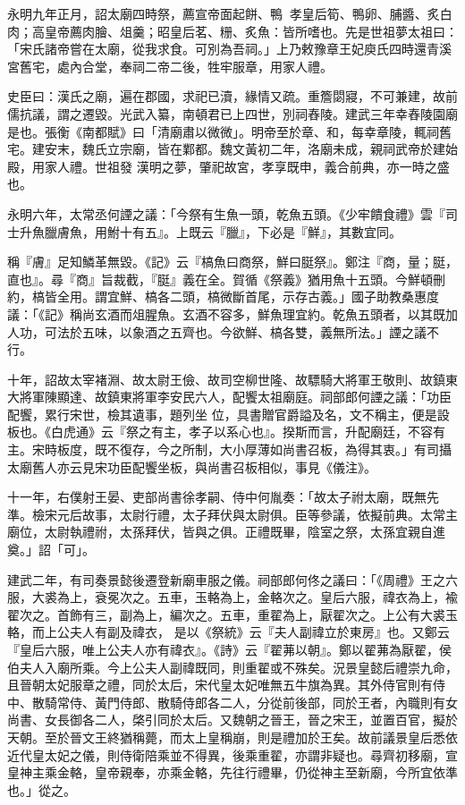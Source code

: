 \begin{pinyinscope}
 永明九年正月，詔太廟四時祭，薦宣帝面起餅、鴨；孝皇后筍、鴨卵、脯醬、炙白肉；高皇帝薦肉膾、俎羹；昭皇后茗、粣、炙魚：皆所嗜也。先是世祖夢太祖曰：「宋氏諸帝嘗在太廟，從我求食。可別為吾祠。」上乃敕豫章王妃庾氏四時還青溪宮舊宅，處內合堂，奉祠二帝二後，牲牢服章，用家人禮。



 史臣曰：漢氏之廟，遍在郡國，求祀已瀆，緣情又疏。重簷閟寢，不可兼建，故前儒抗議，謂之遷毀。光武入纂，南頓君已上四世，別祠舂陵。建武三年幸舂陵園廟是也。張衡《南都賦》曰「清廟肅以微微」。明帝至於章、和，每幸章陵，輒祠舊宅。建安末，魏氏立宗廟，皆在鄴都。魏文黃初二年，洛廟未成，親祠武帝於建始殿，用家人禮。世祖發
 漢明之夢，肇祀故宮，孝享既申，義合前典，亦一時之盛也。



 永明六年，太常丞何諲之議：「今祭有生魚一頭，乾魚五頭。《少牢饋食禮》雲『司士升魚臘膚魚，用鮒十有五』。上既云『臘』，下必是『鮮』，其數宜同。



 稱『膚』足知鱗革無毀。《記》云『槁魚曰商祭，鮮曰脡祭』。鄭注『商，量；脡，直也』。尋『商』旨裁截，『脡』義在全。賀循《祭義》猶用魚十五頭。今鮮頓刪約，槁皆全用。謂宜鮮、槁各二頭，槁微斷首尾，示存古義。」國子助教桑惠度議：「《記》稱尚玄酒而俎腥魚。玄酒不容多，鮮魚理宜約。乾魚五頭者，以其既加人功，可法於五味，以象酒之五齊也。今欲鮮、槁各雙，義無所法。」諲之議不行。



 十年，詔故太宰褚淵、故太尉王儉、故司空柳世隆、故驃騎大將軍王敬則、故鎮東大將軍陳顯達、故鎮東將軍李安民六人，配饗太祖廟庭。祠部郎何諲之議：「功臣配饗，累行宋世，檢其遺事，題列坐
 位，具書贈官爵謚及名，文不稱主，便是設板也。《白虎通》云『祭之有主，孝子以系心也』。揆斯而言，升配廟廷，不容有主。宋時板度，既不復存，今之所制，大小厚薄如尚書召板，為得其衷。」有司攝太廟舊人亦云見宋功臣配饗坐板，與尚書召板相似，事見《儀注》。



 十一年，右僕射王晏、吏部尚書徐孝嗣、侍中何胤奏：「故太子祔太廟，既無先準。檢宋元后故事，太尉行禮，太子拜伏與太尉俱。臣等參議，依擬前典。太常主廟位，太尉執禮祔，太孫拜伏，皆與之俱。正禮既畢，陰室之祭，太孫宜親自進奠。」詔「可」。



 建武二年，有司奏景懿後遷登新廟車服之儀。祠部郎何佟之議曰：「《周禮》王之六服，大裘為上，袞冕次之。五車，玉輅為上，金輅次之。皇后六服，禕衣為上，褕翟次之。首飾有三，副為上，編次之。五車，重翟為上，厭翟次之。上公有大裘玉輅，而上公夫人有副及禕衣，
 是以《祭統》云『夫人副禕立於東房』也。又鄭云『皇后六服，唯上公夫人亦有禕衣』。《詩》云『翟茀以朝』。鄭以翟茀為厭翟，侯伯夫人入廟所乘。今上公夫人副禕既同，則重翟或不殊矣。況景皇懿后禮崇九命，且晉朝太妃服章之禮，同於太后，宋代皇太妃唯無五牛旗為異。其外侍官則有侍中、散騎常侍、黃門侍郎、散騎侍郎各二人，分從前後部，同於王者，內職則有女尚書、女長御各二人，棨引同於太后。又魏朝之晉王，晉之宋王，並置百官，擬於天朝。至於晉文王終猶稱薨，而太上皇稱崩，則是禮加於王矣。故前議景皇后悉依近代皇太妃之儀，則侍衛陪乘並不得異，後乘重翟，亦謂非疑也。尋齊初移廟，宣皇神主乘金輅，皇帝親奉，亦乘金輅，先往行禮畢，仍從神主至新廟，今所宜依準也。」從之。




\end{pinyinscope}
